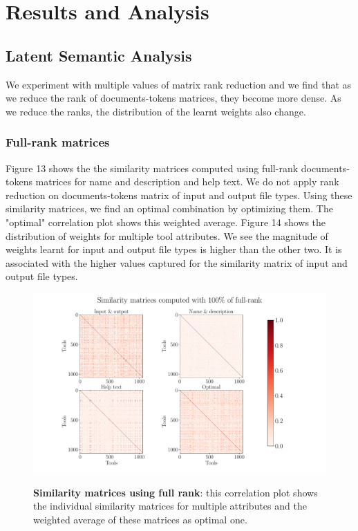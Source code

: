 \chapter{Results and Analysis}
\section{Latent Semantic Analysis}
We experiment with multiple values of matrix rank reduction and we find that as we reduce the rank of documents-tokens matrices, they become more dense. As we reduce the ranks, the distribution of  the learnt weights also change. 

\subsection{Full-rank matrices}

Figure 13 shows the the similarity matrices computed using full-rank documents-tokens matrices for name and description and help text. We do not apply rank reduction on documents-tokens matrix of input and output file types. Using these similarity matrices, we find an optimal combination by optimizing them. The "optimal" correlation plot shows this weighted average. Figure 14 shows the distribution of weights for multiple tool attributes. We see the magnitude of weights learnt for input and output file types is higher than the other two. It is associated with the higher values captured for the similarity matrix of input and output file types.

\begin{figure}[h]
\begin{centering}
    {\includegraphics[scale=0.35]{figures/Similarity_matrices_100.pdf}}
    \caption[Similarity matrices full rank]{\textbf{Similarity matrices using full rank}: this correlation plot shows the individual similarity matrices for multiple attributes and the weighted average of these matrices as optimal one.}
\end{centering}
\end{figure}

